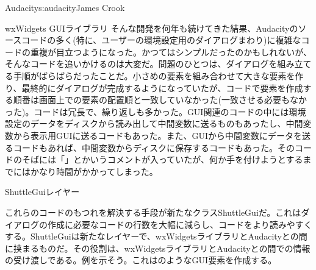 \begin{aosachapter}{Audacity}{s:audacity}{James Crook}
\begin{aosasect1}{wxWidgets GUIライブラリ}
そんな開発を何年も続けてきた結果、Audacityのソースコードの多く(特に、ユーザーの環境設定用のダイアログまわり)に複雑なコードの重複が目立つようになった。かつてはシンプルだったのかもしれないが、そんなコードを追いかけるのは大変だ。問題のひとつは、ダイアログを組み立てる手順がばらばらだったことだ。小さめの要素を組み合わせて大きな要素を作り、最終的にダイアログが完成するようになっていたが、コードで要素を作成する順番は画面上での要素の配置順と一致していなかった(一致させる必要もなかった)。コードは冗長で、繰り返しも多かった。GUI関連のコードの中には環境設定のデータをディスクから読み出して中間変数に送るものもあったし、中間変数から表示用GUIに送るコードもあった。また、GUIから中間変数にデータを送るコードもあれば、中間変数からディスクに保存するコードもあった。そのコードのそばには「」とかいうコメントが入っていたが、何か手を付けようとするまでにはかなり時間がかかってしまった。

\end{aosasect1}

\begin{aosasect1}{ShuttleGuiレイヤー}

これらのコードのもつれを解決する手段が新たなクラスShuttleGuiだ。これはダイアログの作成に必要なコードの行数を大幅に減らし、コードをより読みやすくする。ShuttleGuiは新たなレイヤーで、wxWidgetsライブラリとAudacityとの間に挟まるものだ。その役割は、wxWidgetsライブラリとAudacityとの間での情報の受け渡しである。例を示そう。これはのようなGUI要素を作成する。


\end{aosasect1}
\end{aosachapter}
